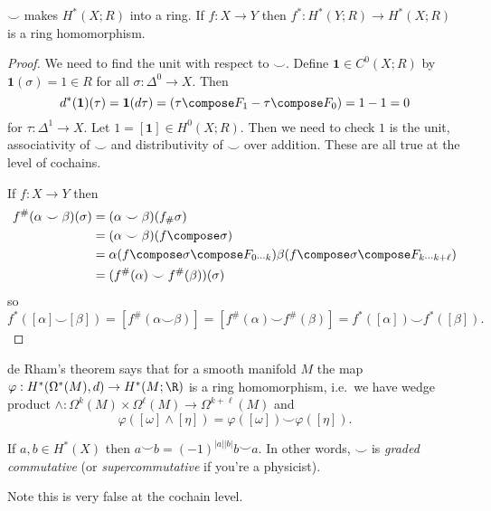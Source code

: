 \documentclass[a4paper]{article}
\newcommand*{\cp}{\smile} %
\begin{document}
\begin{proposition}
  \(\cp\) makes \(H^*(X; R)\) into a ring. If \(f: X \to Y\) then \(f^*: H^*(Y; R) \to H^*(X; R)\) is a ring homomorphism.
\end{proposition}

\begin{proof}
  We need to find the unit with respect to \(\cp\). Define \(\mathbf 1 \in C^0(X; R)\) by \(\mathbf 1(\sigma) = 1 \in R\) for all \(\sigma: \Delta^0 \to X\). Then
  \[
    d^*(\mathbf 1)(\tau) = \mathbf 1(d \tau) = \mathbf (\tau \compose F_1 - \tau \compose F_0) = 1 - 1 = 0
  \]
  for \(\tau: \Delta^1 \to X\). Let \(1 = [\mathbf 1] \in H^0(X; R)\). Then we need to check \(1\) is the unit, associativity of \(\cp\) and distributivity of \(\cp\) over addition. These are all true at the level of cochains.

  If \(f: X \to Y\) then
  \begin{align*}
    f^\#(\alpha \cp \beta) (\sigma)
    &= (\alpha \cp \beta) (f_\# \sigma) \\
    &= (\alpha \cp \beta) (f \compose \sigma) \\
    &= \alpha(f \compose \sigma \compose F_{0 \cdots k}) \beta (f \compose \sigma \compose F_{k \cdots k + \ell}) \\
    &= (f^\#(\alpha) \cp f^\#(\beta)) (\sigma)
  \end{align*}
  so
  \[
    f^*([\alpha] \cp [\beta])
    = [f^\#(\alpha \cp \beta)]
    = [f^\#(\alpha) \cp f^\#(\beta)]
    = f^*([\alpha]) \cp f^*([\beta]).
  \]
\end{proof}

\begin{remark}
  de Rham's theorem says that for a smooth manifold \(M\) the map \(\varphi: H^*(\Omega^*(M), d) \to H^*(M; \R)\) is a ring homomorphism, i.e.\ we have wedge product \(\wedge: \Omega^k(M) \times \Omega^\ell(M) \to \Omega^{k + \ell}(M)\) and
  \[
    \varphi([\omega] \wedge [\eta]) = \varphi([\omega]) \cp \varphi([\eta]).
  \]
\end{remark}

\begin{proposition}
  If \(a, b \in H^*(X)\) then \(a \cp b = (-1)^{|a||b|} b \cp a\). In other words, \(\cp\) is \emph{graded commutative} (or \emph{supercommutative} if you're a physicist).
\end{proposition}

Note this is very false at the cochain level.
\end{document}
